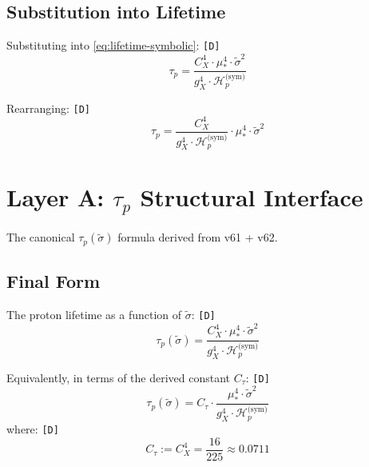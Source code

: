 \documentclass[11pt,a4paper]{article}
\newcommand{\tagD}{\textcolor{green!50!black}{\texttt{[D]}}}
\theoremstyle{definition}
\begin{document}
\subsection{Substitution into Lifetime}
\label{subsec:substitution}

Substituting into \cref{eq:lifetime-symbolic}: \tagD{}
\begin{equation}
\label{eq:taup-substituted}
\tau_p = \frac{C_X^4 \cdot \mu_*^4 \cdot \tilde{\sigma}^2}{g_X^4 \cdot \mathcal{H}_p^{\text{(sym)}}}
\end{equation}

Rearranging: \tagD{}
\begin{equation}
\label{eq:taup-rearranged}
\tau_p = \frac{C_X^4}{g_X^4 \cdot \mathcal{H}_p^{\text{(sym)}}} \cdot \mu_*^4 \cdot \tilde{\sigma}^2
\end{equation}

\section{Layer A: $\tau_p$ Structural Interface}
\label{sec:taup-interface}

\begin{interfacebox}
The canonical $\tau_p(\tilde{\sigma})$ formula derived from v61 + v62.
\end{interfacebox}

\subsection{Final Form}
\label{subsec:final-form}

\begin{derivbox}
The proton lifetime as a function of $\tilde{\sigma}$: \tagD{}
\begin{equation}
\label{eq:taup-interface-boxed}
\boxed{\tau_p(\tilde{\sigma}) = \frac{C_X^4 \cdot \mu_*^4 \cdot \tilde{\sigma}^2}{g_X^4 \cdot \mathcal{H}_p^{\text{(sym)}}}}
\end{equation}

Equivalently, in terms of the derived constant $C_\tau$: \tagD{}
\begin{equation}
\label{eq:taup-ctau}
\boxed{\tau_p(\tilde{\sigma}) = C_\tau \cdot \frac{\mu_*^4 \cdot \tilde{\sigma}^2}{g_X^4 \cdot \mathcal{H}_p^{\text{(sym)}}}}
\end{equation}
where: \tagD{}
\begin{equation}
\label{eq:ctau-def}
C_\tau := C_X^4 = \frac{16}{225} \approx 0.0711
\end{equation}
\end{derivbox}
\end{document}
